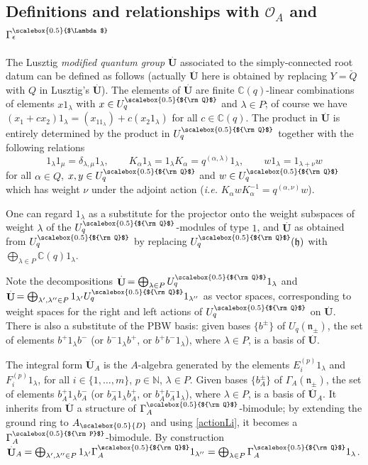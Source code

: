\documentclass[11pt]{amsart}
\newcommand{\e}{\epsilon}
\newcommand{\Oo}{\mathcal{O}}
\newcommand{\Q}{{\scalebox{0.5}{${\rm Q}$}}}
\newcommand{\D}{{\scalebox{0.5}{D}}}
\newcommand{\Pup}{{\scalebox{0.5}{${\rm P}$}}}
\newcommand{\Lam}{{\scalebox{0.5}{$\Lambda$}}}
\begin{document}
\subsection{Definitions and relationships with \texorpdfstring{$\Oo_A$ and $\Gamma_\e^\Lam$}{integral quantum groups}} The Lusztig {\it modified quantum group} $\stackrel{.}{\mathbf{U}}$ associated to the simply-connected root datum \cite[Chaps.\,2, 3 and 23]{Lusztig} can be defined as follows (actually $\stackrel{.}{\mathbf{U}}$ here is obtained by replacing $Y= \check{Q}$ with $Q$ in Lusztig's $\stackrel{.}{\mathbf{U}}$). The elements of $\stackrel{.}{\mathbf{U}}$ are finite $\mathbb{C}(q)$-linear combinations of elements $x1_\lambda$ with $x \in U_q^\Q$ and $\lambda \in P$; of course we have $(x_1 + cx_2)1_\lambda = (x_11_\lambda) + c(x_2 1_\lambda)$ for all $c \in \mathbb{C}(q)$. The product in $\stackrel{.}{\mathbf{U}}$ is entirely determined by the product in $U_q^\Q$ together with the following relations
\[ 1_{\lambda}1_{\mu} = \delta_{\lambda,\mu} 1_{\lambda}, \qquad K_{\alpha}1_{\lambda} = 1_{\lambda}K_{\alpha} = q^{(\alpha,\lambda)} 1_{\lambda}, \qquad w 1_{\lambda} = 1_{\lambda + \nu}w \]
for all $\alpha \in Q$, $x,y \in U_q^\Q$ and $w \in U_q^\Q$ which has weight $\nu$ under the adjoint action (\textit{i.e.} $K_{\alpha}wK_{\alpha}^{-1} = q^{(\alpha,\nu)}w$).

One can regard $1_\lambda$ as a substitute for the projector onto the weight subspaces of weight $\lambda$ of the $U_q^\Q$-modules of type $1$, and $\stackrel{.}{\mathbf{U}}$ as obtained from $U_q^\Q$ by replacing $U_q^\Q(\mathfrak{h})$ with $\textstyle \bigoplus_{\lambda \in P} \mathbb{C}(q)1_{\lambda}$.

Note the decompositions $\textstyle \stackrel{.}{\mathbf{U}}\, = \bigoplus_{\lambda \in P} U_q^\Q 1_{\lambda}$ and $\textstyle \stackrel{.}{\mathbf{U}}\, = \bigoplus_{\lambda',\lambda'' \in P} 1_{\lambda'} U_q^\Q 1_{\lambda''}$ as vector spaces, corresponding to weight spaces for the right and left actions of $U_q^\Q$ on $\stackrel{.}{\mathbf{U}}$. There is also a substitute of the PBW basis: given bases $\{b^\pm\}$ of $U_q(\mathfrak{n}_\pm)$, the set of elements $b^+1_\lambda b^-$ (or $b^-1_\lambda b^+$, or $b^+b^-1_\lambda$), where $\lambda\in P$, is a basis of $\stackrel{.}{\mathbf{U}}$. 

The integral form $\stackrel{.}{\mathbf{U}}_A$ is the $A$-algebra generated by the elements $E_i^{(p)}1_\lambda$  and $F_i^{(p)}1_\lambda$, for all $i\in \{1,\ldots,m\}$, $p\in \mathbb{N}$, $\lambda \in P$. Given bases $\{b_A^\pm\}$ of $\Gamma_A(\mathfrak{n}_\pm)$, the set of elements $b_A^+1_\lambda b_A^-$ (or $b_A^-1_\lambda b_A^+$, or $b_A^+b_A^-1_\lambda$), where $\lambda\in P$, is a basis of $\stackrel{.}{\mathbf{U}}_A$. It inherits from $\stackrel{.}{\mathbf{U}}$ a structure of $\Gamma_A^\Q$-bimodule; by extending the ground ring to $A_\D$ and using \eqref{actionLi}, it becomes a $\Gamma_A^\Pup$-bimodule. By construction $\stackrel{.}{\mathbf{U}}_A\!\!\!{} \textstyle \,=\bigoplus_{\lambda',\lambda''\in P} 1_{\lambda'}\Gamma_A^\Q 1_{\lambda''} = \bigoplus_{\lambda\in P}\Gamma_A^\Q 1_{\lambda}$.
\end{document}
